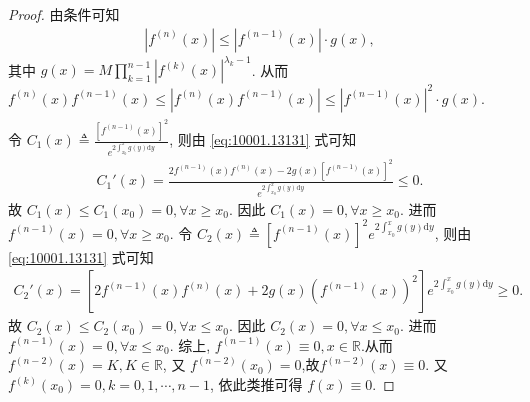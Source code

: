 \documentclass[../../main.tex]{subfiles}%
\begin{document}
\begin{proof}
由条件可知
\begin{align*}
|f^{(n)}(x)| \leqslant |f^{(n-1)}(x)| \cdot g(x),
\end{align*}
其中 $g(x) = M \prod_{k=1}^{n-1} |f^{(k)}(x)|^{\lambda_k - 1}$. 从而 $f^{(n)}(x) f^{(n-1)}(x) \leqslant |f^{(n)}(x) f^{(n-1)}(x)| \leqslant |f^{(n-1)}(x)|^2 \cdot g(x)$.
\begin{align}
\label{eq:10001.13131}
\end{align}
令 $C_1(x) \triangleq \frac{[f^{(n-1)}(x)]^2}{e^{2\int_{x_0}^x g(y) \mathrm{d}y}}$, 则由 \eqref{eq:10001.13131} 式可知
\begin{align*}
C_1'(x) = \frac{2f^{(n-1)}(x) f^{(n)}(x) - 2g(x) [f^{(n-1)}(x)]^2}{e^{2\int_{x_0}^x g(y) \mathrm{d}y}} \leqslant 0.
\end{align*}
故 $C_1(x) \leqslant C_1(x_0) = 0, \forall x \geqslant x_0$. 因此 $C_1(x) = 0, \forall x \geqslant x_0$. 进而 $f^{(n-1)}(x) = 0, \forall x \geqslant x_0$.
令 $C_2(x) \triangleq [f^{(n-1)}(x)]^2 e^{2\int_{x_0}^x g(y) \mathrm{d}y}$, 则由 \eqref{eq:10001.13131} 式可知
\begin{align*}
C_2'(x) = \left[ 2f^{(n-1)}(x) f^{(n)}(x) + 2g(x) (f^{(n-1)}(x))^2 \right] e^{2\int_{x_0}^x g(y) \mathrm{d}y} \geqslant 0.
\end{align*}
故 $C_2(x) \leqslant C_2(x_0) = 0, \forall x \leqslant x_0$. 因此 $C_2(x) = 0, \forall x \leqslant x_0$. 进而 $f^{(n-1)}(x) = 0, \forall x \leqslant x_0$.
综上, $f^{(n-1)}(x) \equiv 0, x \in \mathbb{R}$.从而$f^{(n-2)}(x)=K,K\in \mathbb{R}$, 又 $f^{(n-2)}(x_0) = 0$,故$f^{(n-2)}(x) \equiv 0$. 又 $f^{(k)}(x_0) = 0, k = 0, 1, \cdots, n-1$, 依此类推可得 $f(x) \equiv 0$.
\end{proof}
\end{document}
